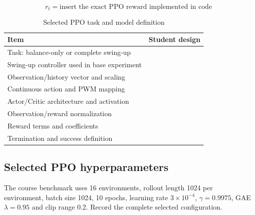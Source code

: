 \documentclass[11pt,a4paper]{article}
\begin{document}
\begin{equation}
r_t=\boxed{\text{insert the exact PPO reward implemented in code}}
\end{equation}

\begin{table}[H]
\centering
\caption{Selected PPO task and model definition}
\label{tab:ppodesign}
\begin{tabularx}{\linewidth}{p{42mm}Y}
\toprule
Item & Student design\\
\midrule
Task: balance-only or complete swing-up & \\
Swing-up controller used in base experiment & \\
Observation/history vector and scaling & \\
Continuous action and PWM mapping & \\
Actor/Critic architecture and activation & \\
Observation/reward normalization & \\
Reward terms and coefficients & \\
Termination and success definition & \\
\bottomrule
\end{tabularx}
\end{table}

\subsection{Selected PPO hyperparameters}

The course benchmark uses 16 environments, rollout length 1024 per
environment, batch size 1024, 10 epochs, learning rate $3\times10^{-4}$,
$\gamma=0.9975$, GAE $\lambda=0.95$ and clip range 0.2. Record the complete
selected configuration.
\end{document}
